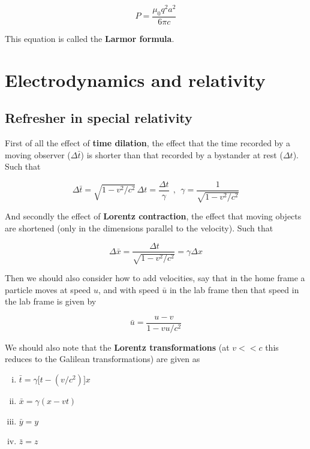 \documentclass[a4paper]{article}
\begin{document}
\begin{equation*}
    P=\frac{\mu_0q^2a^2}{6\pi c}
\end{equation*}

This equation is called the \textbf{Larmor formula}.

\section{Electrodynamics and relativity}

\subsection{Refresher in special relativity}

First of all the effect of \textbf{time dilation}, the effect that the time recorded by a moving observer ($\Delta\bar{t}$) is shorter than that recorded by a bystander at rest ($\Delta t$). Such that

\begin{equation*}
    \Delta\bar{t}=\sqrt{1-v^2/c^2}\,\Delta t=\frac{\Delta t}{\gamma}\ \ ,\ \ \gamma=\frac{1}{\sqrt{1-v^2/c^2}}
\end{equation*}

And secondly the effect of \textbf{Lorentz contraction}, the effect that moving objects are shortened (only in the dimensions parallel to the velocity). Such that

\begin{equation*}
    \Delta\bar{x}=\frac{\,\Delta t}{\sqrt{1-v^2/c^2}}=\gamma\Delta x
\end{equation*}

Then we should also consider how to add velocities, say that in the home frame a particle moves at speed $u$, and with speed $\bar{u}$ in the lab frame then that speed in the lab frame is given by

\begin{equation*}
    \bar{u}=\frac{u-v}{1-vu/c^2}
\end{equation*}

We should also note that the \textbf{Lorentz transformations} (at $v<<c$ this reduces to the Galilean transformations) are given as

\begin{enumerate}[(i)]
    \item $\bar{t}=\gamma\big[t-(v/c^2)\big]x$
    \item $\bar{x}=\gamma(x-vt)$
    \item $\bar{y}=y$
    \item $\bar{z}=z$
\end{enumerate}
\end{document}
